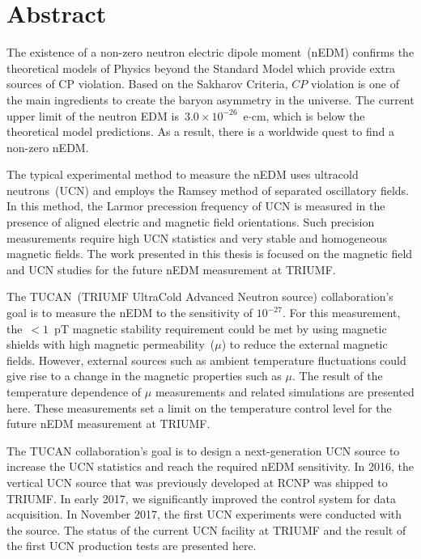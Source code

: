 \documentclass[12pt,a4paper]{book}
\begin{document}
\renewcommand{\thepage}{\roman{page}}
\chapter*{Abstract}
The existence of a non-zero neutron electric dipole moment~(nEDM)
confirms the theoretical models of Physics beyond the Standard Model
which provide extra sources of CP violation. Based on the Sakharov
Criteria, $CP$ violation is one of the main ingredients to create the
baryon asymmetry in the universe. The current upper limit of the
neutron EDM is~$3.0 \times 10^{-26}$~e$\cdot$cm, which is below the
theoretical model predictions. As a result, there is a worldwide
quest to find a non-zero nEDM.

The typical experimental method to measure the nEDM uses ultracold
neutrons~(UCN) and employs the Ramsey method of separated oscillatory
fields. In this method, the Larmor precession frequency of UCN is
measured in the presence of aligned electric and magnetic field
orientations. Such precision measurements require high UCN statistics
and very stable and homogeneous magnetic fields.  The work presented
in this thesis is focused on the magnetic field and UCN studies for
the future nEDM measurement at TRIUMF.

The TUCAN~(TRIUMF UltraCold Advanced Neutron source) collaboration's
goal is to measure the nEDM to the sensitivity of $10^{-27}$. For this
measurement, the~$<1$~pT magnetic stability requirement could be met
by using magnetic shields with high magnetic permeability~($\mu$) to
reduce the external magnetic fields. However, external sources such as
ambient temperature fluctuations could give rise to a change in the
magnetic properties such as $\mu$. The result of the temperature
dependence of $\mu$ measurements and related simulations are presented
here.
These measurements set a limit on the temperature control level for
the future nEDM measurement at TRIUMF.

The TUCAN collaboration's goal is to design a next-generation UCN
source to increase the UCN statistics and reach the required nEDM
sensitivity. In 2016, the vertical UCN source that was previously
developed at RCNP was shipped to TRIUMF. In early 2017, we
significantly improved the control system for data acquisition. In
November 2017, the first UCN experiments were conducted with the
source. The status of the current UCN facility at TRIUMF and the
result of the first UCN production tests are presented here.
\end{document}
